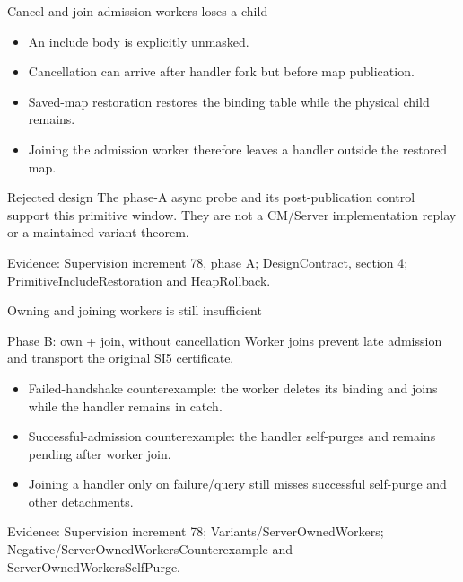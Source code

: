 \documentclass[11pt,aspectratio=169]{beamer}
\newcommand{\evidence}[1]{\vfill{\fontsize{7}{8}\selectfont\color{Muted}Evidence: #1\par}}
\begin{document}
\begin{frame}{Cancel-and-join admission workers loses a child}
\begin{itemize}\setlength\itemsep{2.5mm}
\item An include body is explicitly unmasked.
\item Cancellation can arrive after handler fork but before map publication.
\item Saved-map restoration restores the binding table while the physical child remains.
\item Joining the admission worker therefore leaves a handler outside the restored map.
\end{itemize}\begin{alertblock}{Rejected design}
The phase-A async probe and its post-publication control support this primitive window. They are not a CM/Server implementation replay or a maintained variant theorem.
\end{alertblock}
\evidence{Supervision increment 78, phase A; DesignContract, section 4; PrimitiveIncludeRestoration and HeapRollback.}
\end{frame}

\begin{frame}{Owning and joining workers is still insufficient}
\begin{block}{Phase B: own + join, without cancellation}
Worker joins prevent late admission and transport the original SI5 certificate.
\end{block}\begin{itemize}\setlength\itemsep{2.5mm}
\item Failed-handshake counterexample: the worker deletes its binding and joins while the handler remains in catch.
\item Successful-admission counterexample: the handler self-purges and remains pending after worker join.
\item Joining a handler only on failure/query still misses successful self-purge and other detachments.
\end{itemize}
\evidence{Supervision increment 78; Variants/ServerOwnedWorkers; Negative/ServerOwnedWorkersCounterexample and ServerOwnedWorkersSelfPurge.}
\end{frame}
\end{document}
